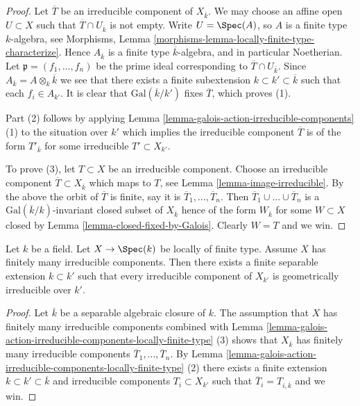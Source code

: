 \begin{proof}
Let $\overline{T}$ be an irreducible component of $X_{\overline{k}}$.
We may choose an affine open $U \subset X$ such that
$\overline{T} \cap U_{\overline{k}}$ is not empty.
Write $U = \Spec(A)$, so $A$ is a finite type $k$-algebra, see
Morphisms, Lemma \ref{morphisms-lemma-locally-finite-type-characterize}.
Hence $A_{\overline{k}}$ is a finite type $\overline{k}$-algebra,
and in particular Noetherian. Let $\mathfrak p = (f_1, \ldots, f_n)$
be the prime ideal corresponding to $\overline{T} \cap U_{\overline{k}}$.
Since $A_{\overline{k}} = A \otimes_k \overline{k}$
we see that there exists a finite subextension
$k \subset k' \subset \overline{k}$ such that each $f_i \in A_{k'}$.
It is clear that $\text{Gal}(\overline{k}/k')$
fixes $\overline{T}$, which proves (1).

\medskip\noindent
Part (2) follows by applying
Lemma \ref{lemma-galois-action-irreducible-components} (1)
to the situation over $k'$ which implies the irreducible component
$\overline{T}$ is of the form $T'_{\overline{k}}$ for some irreducible
$T' \subset X_{k'}$.

\medskip\noindent
To prove (3), let $T \subset X$ be an irreducible component.
Choose an irreducible component $\overline{T} \subset X_{\overline{k}}$
which maps to $T$, see
Lemma \ref{lemma-image-irreducible}.
By the above the orbit of $\overline{T}$ is finite, say it is
$\overline{T}_1, \ldots, \overline{T}_n$. Then
$\overline{T}_1 \cup \ldots \cup \overline{T}_n$
is a $\text{Gal}(\overline{k}/k)$-invariant closed subset of $X_{\overline{k}}$
hence of the form $W_{\overline{k}}$ for some $W \subset X$ closed by
Lemma \ref{lemma-closed-fixed-by-Galois}.
Clearly $W = T$ and we win.
\end{proof}

\begin{lemma}
\label{lemma-finite-extension-geometrically-irreducible-components}
Let $k$ be a field.
Let $X \to \Spec(k)$ be locally of finite type.
Assume $X$ has finitely many irreducible components.
Then there exists a finite separable extension $k \subset k'$
such that every irreducible component of $X_{k'}$
is geometrically irreducible over $k'$.
\end{lemma}

\begin{proof}
Let $\overline{k}$ be a separable algebraic closure of $k$.
The assumption that $X$ has finitely many irreducible components
combined with
Lemma \ref{lemma-galois-action-irreducible-components-locally-finite-type} (3)
shows that $X_{\overline{k}}$ has finitely many irreducible components
$\overline{T}_1, \ldots, \overline{T}_n$. By
Lemma \ref{lemma-galois-action-irreducible-components-locally-finite-type} (2)
there exists a finite extension $k \subset k' \subset \overline{k}$ and
irreducible components $T_i \subset X_{k'}$ such that
$\overline{T}_i = T_{i, \overline{k}}$ and we win.
\end{proof}

